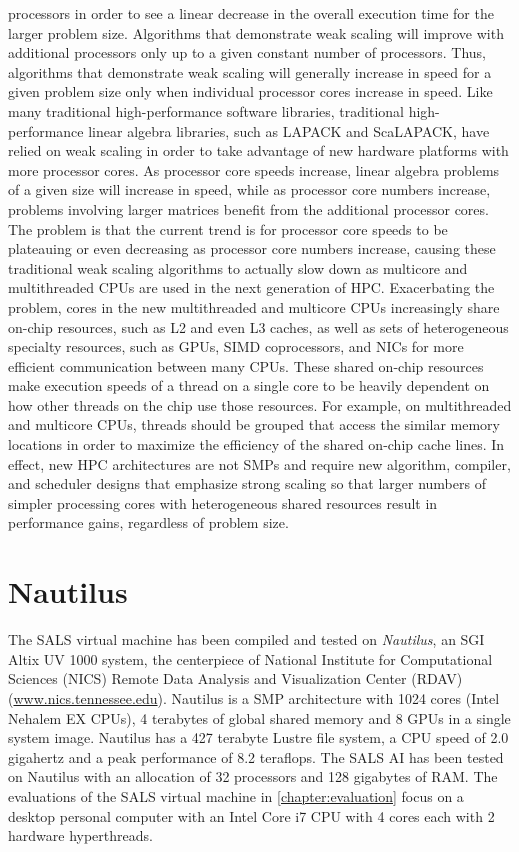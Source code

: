 processors in order to see a linear decrease in the overall execution
time for the larger problem size.  Algorithms that demonstrate weak
scaling will improve with additional processors only up to a given
constant number of processors.  Thus, algorithms that demonstrate weak
scaling will generally increase in speed for a given problem size only
when individual processor cores increase in speed.  Like many
traditional high-performance software libraries, traditional
high-performance linear algebra libraries, such as LAPACK and
ScaLAPACK, have relied on weak scaling in order to take advantage of
new hardware platforms with more processor cores.  As processor core
speeds increase, linear algebra problems of a given size will increase
in speed, while as processor core numbers increase, problems involving
larger matrices benefit from the additional processor cores.  The
problem is that the current trend is for processor core speeds to be
plateauing or even decreasing as processor core numbers increase,
causing these traditional weak scaling algorithms to actually slow
down as multicore and multithreaded CPUs are used in the next
generation of HPC.  Exacerbating the problem, cores in the new
multithreaded and multicore CPUs increasingly share on-chip resources,
such as L2 and even L3 caches, as well as sets of heterogeneous
specialty resources, such as GPUs, SIMD coprocessors, and NICs for
more efficient communication between many CPUs.  These shared on-chip
resources make execution speeds of a thread on a single core to be
heavily dependent on how other threads on the chip use those
resources.  For example, on multithreaded and multicore CPUs, threads
should be grouped that access the similar memory locations in order to
maximize the efficiency of the shared on-chip cache lines.  In effect,
new HPC architectures are not SMPs and require new algorithm,
compiler, and scheduler designs that emphasize strong scaling so that
larger numbers of simpler processing cores with heterogeneous shared
resources result in performance gains, regardless of problem size.

\section{Nautilus}

The SALS virtual machine has been compiled and tested on
{\emph{Nautilus}}, an SGI Altix UV 1000 system, the centerpiece of
National Institute for Computational Sciences (NICS) Remote Data
Analysis and Visualization Center (RDAV)
(\url{www.nics.tennessee.edu}).  Nautilus is a SMP architecture with
1024 cores (Intel Nehalem EX CPUs), 4 terabytes of global shared
memory and 8 GPUs in a single system image.  Nautilus has a 427
terabyte Lustre file system, a CPU speed of 2.0 gigahertz and a peak
performance of 8.2 teraflops.  The SALS AI has been tested on Nautilus
with an allocation of 32 processors and 128 gigabytes of RAM.  The
evaluations of the SALS virtual machine in
{\mbox{\autoref{chapter:evaluation}}} focus on a desktop personal
computer with an Intel Core i7 CPU with 4 cores each with 2 hardware
hyperthreads.


